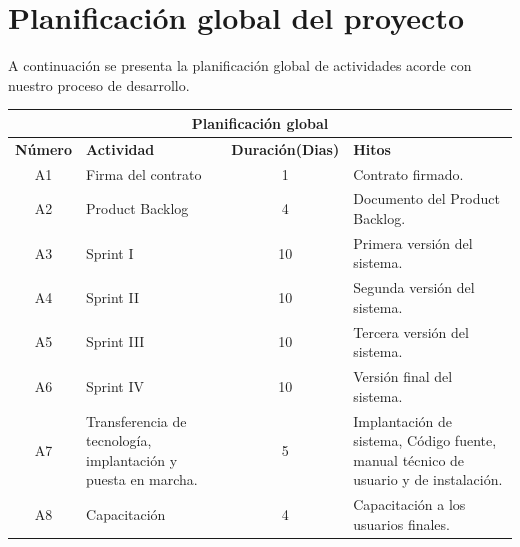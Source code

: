\documentclass[11pt,letterpaper]{report}
\begin{document}
\section{Planificación global del proyecto}
A continuación se presenta la planificación global de actividades acorde con nuestro proceso de desarrollo.
\begin{center}
\begin{tabular}{|c|p{4.5cm}|c|p{6cm}|}
	\hline
	\multicolumn{4}{|c|}{\textbf{Planificación global}} \\
	\hline
	\textbf{ Número} & \textbf{Actividad} & \textbf{Duración(Dias)} & \textbf{Hitos} \\ \hline
	A1 & Firma del contrato & 1 & Contrato firmado. \\ \hline
	A2 & Product Backlog & 4 & Documento del Product Backlog. \\ \hline
	A3 & Sprint I & 10 & Primera versión del sistema. \\ \hline
	A4 & Sprint II & 10 & Segunda versión del sistema. \\ \hline
	A5 & Sprint III & 10 & Tercera versión del sistema. \\ \hline
	A6 & Sprint IV & 10 & Versión final del sistema. \\ \hline
	A7 & Transferencia de tecnología, implantación y puesta en marcha. & 5 & Implantación de sistema, Código fuente, manual técnico  de usuario y de instalación. \\  \hline
	A8 & Capacitación & 4 &  Capacitación a los usuarios finales.\\ \hline
\end{tabular}
\end{center}
\end{document}
